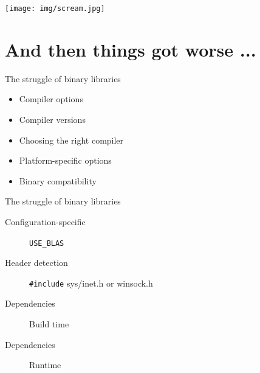 \documentclass[pdf]{beamer}
\begin{document}
\begin{frame}
    \begin{center}
        \texttt{[image: img/scream.jpg]}
    \end{center}
\end{frame}

\section{And then things got worse ...}

\begin{frame}{The struggle of binary libraries}
    \begin{itemize}
        \item Compiler options
        \item Compiler versions
        \item Choosing the right compiler
        \item Platform-specific options
        \item Binary compatibility
    \end{itemize}
\end{frame}

\begin{frame}[fragile]{The struggle of binary libraries}
    \begin{description}
        \item [Configuration-specific] \verb|USE_BLAS|
        \item [Header detection] \verb|#include| sys/inet.h or winsock.h
        \item [Dependencies] Build time
        \item [Dependencies] Runtime
    \end{description}

\end{frame}
\end{document}
